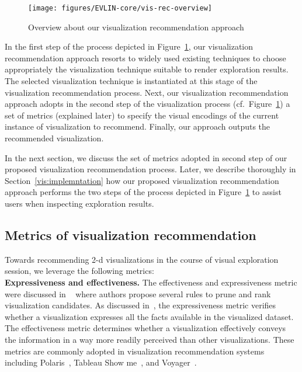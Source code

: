 \begin{figure}[t]
\centering
\texttt{[image: figures/EVLIN-core/vis-rec-overview]}
\caption{Overview about our visualization recommendation approach}
\label{fig:vis-overview}
\end{figure}


In the first step of the process depicted in Figure~\ref{fig:vis-overview}, our visualization recommendation approach resorts to widely used existing techniques to choose appropriately the visualization technique suitable to render exploration results.
The selected visualization technique is instantiated  at this stage of the visualization recommendation process.
Next, our visualization recommendation approach adopts in the second step of the visualization process (cf.~Figure~\ref{fig:vis-overview}) a set of metrics (explained later) to specify the visual encodings of the current instance of visualization to recommend.
Finally, our approach outputs the recommended visualization.

In the next section, we discuss the set of metrics adopted in second step of our proposed visualization recommendation process. Later, we describe thoroughly in Section~\ref{vis:implemntation} how our proposed visualization recommendation approach performs the two steps of the process depicted in Figure~\ref{fig:vis-overview} to assist users when inspecting exploration results.


\subsection{Metrics of visualization recommendation}
\label{sec:vis-metrics}
Towards recommending 2-d visualizations in the course of visual exploration session, we leverage the following metrics:\\
\noindent \textbf{Expressiveness and effectiveness.} 
The effectiveness and expressiveness metric were discussed in ~\cite{Cleveland.McGill1984,Mackinlay86}  where authors propose several rules to prune and rank visualization candidates.
As discussed in~\cite{augmentingwongsuphasawat2018}, the expressiveness metric verifies whether a visualization expresses all the facts available in the visualized dataset.
The effectiveness metric determines whether a visualization effectively conveys the information in a way more readily perceived than other visualizations. 
These metrics are commonly adopted in visualization recommendation systems including Polaris~\cite{polaris2002}, Tableau Show me~\cite{Mackinlay:2007}, and Voyager~\cite{Wongsuphasawat2016}. 



